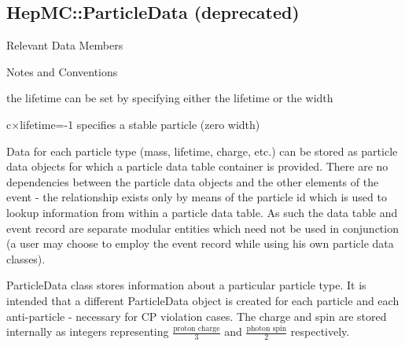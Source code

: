 \documentclass[11pt,letterpaper]{article}
\begin{document}
%
%

\subsection{HepMC::ParticleData (deprecated)}

\begin{myitemize}{Relevant Data Members}
\end{myitemize}
\begin{myitemize}{Notes and Conventions}
  \item the lifetime can be set by specifying either 
    the lifetime or the width
  \item c$\times$lifetime=-1 specifies a stable particle (zero width)
\end{myitemize}

Data for each particle type (mass, lifetime, charge, etc.) can be
stored as particle data objects for which a particle data table
container is provided. There are no dependencies between the particle
data objects and the other elements of the event - the relationship
exists only by means of the particle id which is used to lookup
information from within a particle data table. As such the data table
and event record are separate modular entities which need not be used
in conjunction (a user may choose to employ the event record while
using his own particle data classes).

ParticleData class stores information about a particular particle
type. It is intended that a different ParticleData object is created 
for each particle and each anti-particle - necessary for CP violation
cases. The charge and spin are stored internally as integers representing
$\frac{\mbox{proton charge}}{3}$ and $\frac{\mbox{photon spin}}{2}$
respectively. 

%
%
\end{document}
